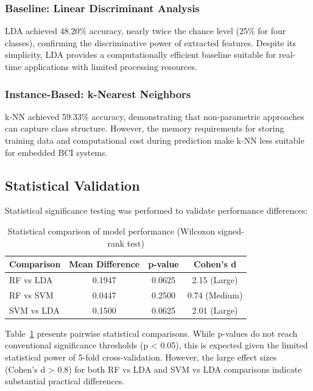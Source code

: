 \documentclass[11pt]{article}
\begin{document}
\subsubsection{Baseline: Linear Discriminant Analysis}

LDA achieved 48.20\% accuracy, nearly twice the chance level (25\% for four classes), confirming the discriminative power of extracted features. Despite its simplicity, LDA provides a computationally efficient baseline suitable for real-time applications with limited processing resources.

\subsubsection{Instance-Based: k-Nearest Neighbors}

k-NN achieved 59.33\% accuracy, demonstrating that non-parametric approaches can capture class structure. However, the memory requirements for storing training data and computational cost during prediction make k-NN less suitable for embedded BCI systems.

\subsection{Statistical Validation}

Statistical significance testing was performed to validate performance differences:

\begin{table}[H]
\centering
\caption{Statistical comparison of model performance (Wilcoxon signed-rank test)}
\label{tab:statistical}
\begin{tabular}{@{}lccc@{}}
\toprule
\textbf{Comparison} & \textbf{Mean Difference} & \textbf{p-value} & \textbf{Cohen's d} \\
\midrule
RF vs LDA & 0.1947 & 0.0625 & 2.15 (Large) \\
RF vs SVM & 0.0447 & 0.2500 & 0.74 (Medium) \\
SVM vs LDA & 0.1500 & 0.0625 & 2.01 (Large) \\
\bottomrule
\end{tabular}
\end{table}

Table~\ref{tab:statistical} presents pairwise statistical comparisons. While p-values do not reach conventional significance thresholds (p < 0.05), this is expected given the limited statistical power of 5-fold cross-validation. However, the large effect sizes (Cohen's d > 0.8) for both RF vs LDA and SVM vs LDA comparisons indicate substantial practical differences.
\end{document}
